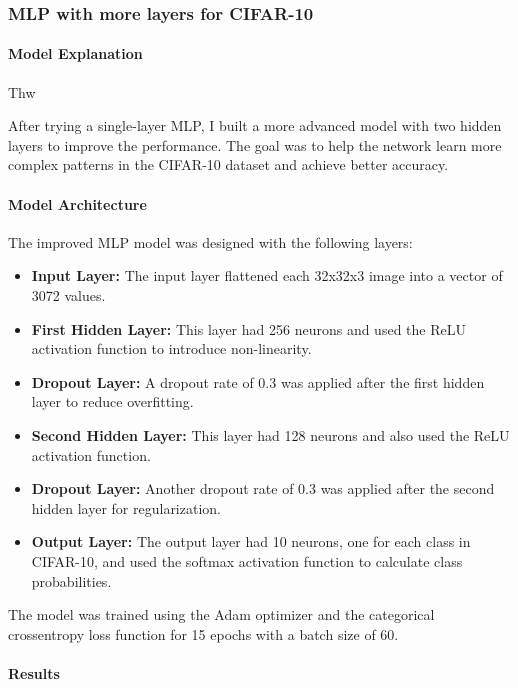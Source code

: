 \documentclass[lettersize,journal]{IEEEtran}
\begin{document}
\subsubsection{\textbf{ MLP with more layers for CIFAR-10}}
\paragraph{\textbf{Model Explanation}}

Thw 

After trying a single-layer MLP, I built a more advanced model with two hidden layers to improve the performance. The goal was to help the network learn more complex patterns in the CIFAR-10 dataset and achieve better accuracy.

\paragraph{\textbf{Model Architecture}}

The improved MLP model was designed with the following layers:
\begin{itemize}
    \item \textbf{Input Layer:} The input layer flattened each 32x32x3 image into a vector of 3072 values.
    \item \textbf{First Hidden Layer:} This layer had 256 neurons and used the ReLU activation function to introduce non-linearity.
    \item \textbf{Dropout Layer:} A dropout rate of 0.3 was applied after the first hidden layer to reduce overfitting.
    \item \textbf{Second Hidden Layer:} This layer had 128 neurons and also used the ReLU activation function.
    \item \textbf{Dropout Layer:} Another dropout rate of 0.3 was applied after the second hidden layer for regularization.
    \item \textbf{Output Layer:} The output layer had 10 neurons, one for each class in CIFAR-10, and used the softmax activation function to calculate class probabilities.
\end{itemize}

The model was trained using the Adam optimizer and the categorical crossentropy loss function for 15 epochs with a batch size of 60.

\paragraph{\textbf{Results}}
\end{document}
